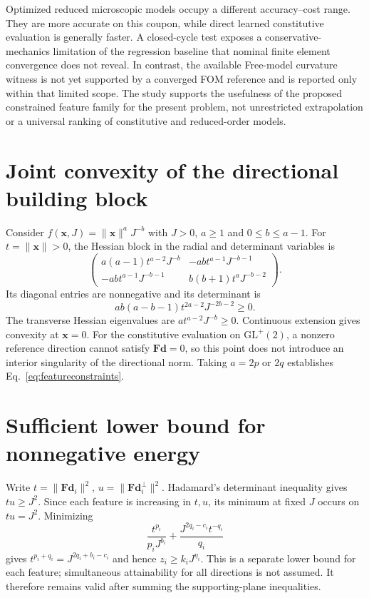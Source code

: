 \documentclass[10pt,a4paper]{article}
\newcommand{\F}{\bm F}
\newcommand{\GL}{\mathrm{GL}^{+}(2)}
\begin{document}
Optimized reduced microscopic models occupy a different accuracy--cost range. They are more accurate on this coupon, while direct learned constitutive evaluation is generally faster. A closed-cycle test exposes a conservative-mechanics limitation of the regression baseline that nominal finite element convergence does not reveal. In contrast, the available Free-model curvature witness is not yet supported by a converged FOM reference and is reported only within that limited scope. The study supports the usefulness of the proposed constrained feature family for the present problem, not unrestricted extrapolation or a universal ranking of constitutive and reduced-order models.

\appendix
\section{Joint convexity of the directional building block}
\label{app:convex}
Consider $f(\bm x,J)=\|\bm x\|^aJ^{-b}$ with $J>0$, $a\geq1$ and $0\leq b\leq a-1$. For $t=\|\bm x\|>0$, the Hessian block in the radial and determinant variables is
\begin{equation}
 \begin{pmatrix}
 a(a-1)t^{a-2}J^{-b} & -ab t^{a-1}J^{-b-1}\\
 -ab t^{a-1}J^{-b-1} & b(b+1)t^aJ^{-b-2}
 \end{pmatrix}.
\end{equation}
Its diagonal entries are nonnegative and its determinant is
\begin{equation}
 ab(a-b-1)t^{2a-2}J^{-2b-2}\geq0.
\end{equation}
The transverse Hessian eigenvalues are $a t^{a-2}J^{-b}\geq0$. Continuous extension gives convexity at $\bm x=0$. For the constitutive evaluation on $\GL$, a nonzero reference direction cannot satisfy $\F\bm d=0$, so this point does not introduce an interior singularity of the directional norm. Taking $a=2p$ or $2q$ establishes Eq.~\eqref{eq:featureconstraints}.

\section{Sufficient lower bound for nonnegative energy}
\label{app:nonnegative}
Write $t=\|\F\bm d_i\|^2$, $u=\|\F\bm d_i^\perp\|^2$. Hadamard's determinant inequality gives $tu\geq J^2$. Since each feature is increasing in $t,u$, its minimum at fixed $J$ occurs on $tu=J^2$. Minimizing
\begin{equation}
 \frac{t^{p_i}}{p_iJ^{b_i}}+\frac{J^{2q_i-c_i}t^{-q_i}}{q_i}
\end{equation}
gives $t^{p_i+q_i}=J^{2q_i+b_i-c_i}$ and hence $z_i\geq k_iJ^{\eta_i}$. This is a separate lower bound for each feature; simultaneous attainability for all directions is not assumed. It therefore remains valid after summing the supporting-plane inequalities.
\end{document}
